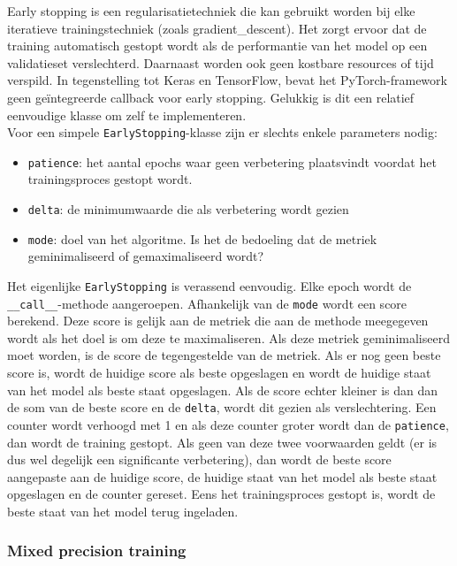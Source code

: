 Early stopping is een regularisatietechniek die kan gebruikt worden bij elke iteratieve trainingstechniek (zoals \gls{gradient_descent}). Het zorgt ervoor dat de training automatisch gestopt wordt als de performantie van het model op een validatieset verslechterd. Daarnaast worden ook geen kostbare resources of tijd verspild. \autocite{Prechelt_1998} In tegenstelling tot Keras en TensorFlow, bevat het PyTorch-framework geen geïntegreerde callback voor early stopping. Gelukkig is dit een relatief eenvoudige klasse om zelf te implementeren. \\

Voor een simpele \texttt{EarlyStopping}-klasse zijn er slechts enkele parameters nodig: 

\begin{itemize}
    \item \texttt{patience}: het aantal epochs waar geen verbetering plaatsvindt voordat het trainingsproces gestopt wordt.
    \item \texttt{delta}: de minimumwaarde die als verbetering wordt gezien
    \item \texttt{mode}: doel van het algoritme. Is het de bedoeling dat de metriek geminimaliseerd of gemaximaliseerd wordt?
\end{itemize}

Het eigenlijke \texttt{EarlyStopping} is verassend eenvoudig. Elke epoch wordt de \texttt{\_\_call\_\_}-methode aangeroepen. Afhankelijk van de \texttt{mode} wordt een score berekend. Deze score is gelijk aan de metriek die aan de methode meegegeven wordt als het doel is om deze te maximaliseren. Als deze metriek geminimaliseerd moet worden, is de score de tegengestelde van de metriek. Als er nog geen beste score is, wordt de huidige score als beste opgeslagen en wordt de huidige staat van het model als beste staat opgeslagen. Als de score echter kleiner is dan dan de som van de beste score en de \texttt{delta}, wordt dit gezien als verslechtering. Een counter wordt verhoogd met 1 en als deze counter groter wordt dan de \texttt{patience}, dan wordt de training gestopt. Als geen van deze twee voorwaarden geldt (er is dus wel degelijk een significante verbetering), dan wordt de beste score aangepaste aan de huidige score, de huidige staat van het model als beste staat opgeslagen en de counter gereset. Eens het trainingsproces gestopt is, wordt de beste staat van het model terug ingeladen.

\subsubsection{Mixed precision training}

